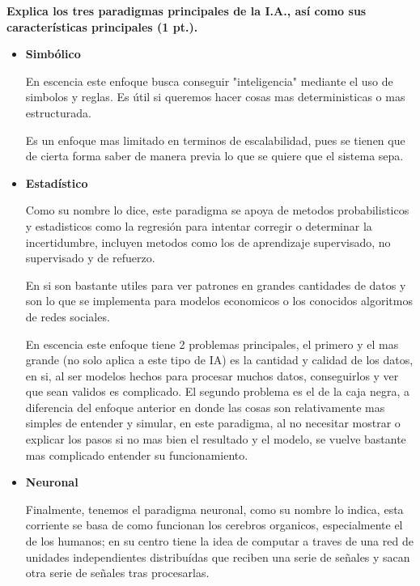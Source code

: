 \textbf{Explica los tres paradigmas principales de la I.A., así como sus características principales (1 pt.).}

\begin{itemize}
    \item \textbf{Simbólico}
    
    En escencia este enfoque busca conseguir "inteligencia" mediante el uso de simbolos y reglas. Es útil si queremos hacer cosas mas deterministicas o mas estructurada. \vspace{.3cm}

    Es un enfoque mas limitado en terminos de escalabilidad, pues se tienen que de cierta forma saber de manera previa lo que se quiere que el sistema sepa. \vspace{.3cm}
    
    \cite{russell2020artificial}

    \item \textbf{Estadístico}
    
    Como su nombre lo dice, este paradigma se apoya de metodos probabilisticos y estadisticos como la regresión para intentar corregir o determinar la incertidumbre, incluyen metodos como los de aprendizaje supervisado, no supervisado y de refuerzo. \vspace{.3cm}

    En si son bastante utiles para ver patrones en grandes cantidades de datos y son lo que se implementa para modelos economicos o los conocidos algoritmos de redes sociales.\vspace{.3cm}

    En escencia este enfoque tiene 2 problemas principales, el primero y el mas grande (no solo aplica a este tipo de IA) es la cantidad y calidad de los datos, en si, al ser modelos hechos para procesar muchos datos, conseguirlos y ver que sean validos es complicado. El segundo problema es el de la caja negra, a diferencia del enfoque anterior en donde las cosas son relativamente mas simples de entender y simular, en este paradigma, al no necesitar mostrar o explicar los pasos si no mas bien el resultado y el modelo, se vuelve bastante mas complicado entender su funcionamiento. \vspace{.3cm}

    \cite{bishop2006pattern}

    \item \textbf{Neuronal}
    
    Finalmente, tenemos el paradigma neuronal, como su nombre lo indica, esta corriente se basa de como funcionan los cerebros organicos, especialmente el de los humanos; en su centro tiene la idea de computar a traves de una red de unidades independientes distribuídas que reciben una serie de señales y sacan otra serie de señales tras procesarlas. \vspace{.3cm}


\end{itemize}
